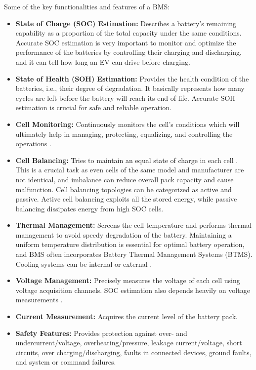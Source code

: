 Some of the key functionalities and features of a BMS:
\begin{itemize}
    \item \textbf{State of Charge (SOC) Estimation:} Describes a battery’s remaining capability as a proportion of the total capacity under the same conditions\cite{wevj-12-00120-v2}. Accurate SOC estimation is very important to monitor and optimize the performance of the batteries by controlling their charging and discharging, and it can tell how long an EV can drive before charging.
    \item \textbf{State of Health (SOH) Estimation:} Provides the health condition of the batteries, i.e., their degree of degradation\cite{wevj-12-00120-v2}. It basically represents how many cycles are left before the battery will reach its end of life. Accurate SOH estimation is crucial for safe and reliable operation.
    \item \textbf{Cell Monitoring:} Continuously monitors the cell's conditions which will ultimately help in managing, protecting, equalizing, and controlling the operations \cite{wevj-12-00120-v2}.
    \item \textbf{Cell Balancing:}\cite{wevj-12-00120-v2} Tries to maintain an equal state of charge in each cell . This is a crucial task as even cells of the same model and manufacturer are not identical, and imbalance can reduce overall pack capacity and cause malfunction. Cell balancing topologies can be categorized as active and passive. Active cell balancing exploits all the stored energy, while passive balancing dissipates energy from high SOC cells. 
    \item \textbf{Thermal Management:} Screens the cell temperature and performs thermal management to avoid speedy degradation of the battery\cite{wevj-12-00120-v2}. Maintaining a uniform temperature distribution is essential for optimal battery operation, and BMS often incorporates Battery Thermal Management Systems (BTMS). Cooling systems can be internal or external \cite{energies-18-00342-v2}. 
    \item \textbf{Voltage Management:} Precisely measures the voltage of each cell using voltage acquisition channels. SOC estimation also depends heavily on voltage measurements \cite{wevj-12-00120-v2}. 
    \item \textbf{Current Measurement:}\cite{wevj-12-00120-v2} Acquires the current level of the battery pack.
    \item \textbf{Safety Features:} \cite{wevj-12-00120-v2} Provides protection against over- and undercurrent/voltage, overheating/pressure, leakage current/voltage, short circuits, over charging/discharging, faults in connected devices, ground faults, and system or command failures. 

\end{itemize}

